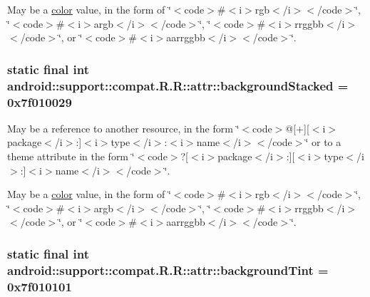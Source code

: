 May be a \hyperlink{classandroid_1_1support_1_1compat_1_1_r_1_1color}{color} value, in the form of \char`\"{}$<$code$>$\#$<$i$>$rgb$<$/i$>$$<$/code$>$\char`\"{}, \char`\"{}$<$code$>$\#$<$i$>$argb$<$/i$>$$<$/code$>$\char`\"{}, \char`\"{}$<$code$>$\#$<$i$>$rrggbb$<$/i$>$$<$/code$>$\char`\"{}, or \char`\"{}$<$code$>$\#$<$i$>$aarrggbb$<$/i$>$$<$/code$>$\char`\"{}. \hypertarget{classandroid_1_1support_1_1compat_1_1_r_1_1attr_b7229506c0bd5bcc93770d3d2d7aed3c}{
\subsubsection[{backgroundStacked}]{\setlength{\rightskip}{0pt plus 5cm}static final int android::support::compat.R.R::attr::backgroundStacked = 0x7f010029}}
\label{classandroid_1_1support_1_1compat_1_1_r_1_1attr_b7229506c0bd5bcc93770d3d2d7aed3c}


May be a reference to another resource, in the form \char`\"{}$<$code$>$@\mbox{[}+\mbox{]}\mbox{[}$<$i$>$package$<$/i$>$:\mbox{]}$<$i$>$type$<$/i$>$:$<$i$>$name$<$/i$>$$<$/code$>$\char`\"{} or to a theme attribute in the form \char`\"{}$<$code$>$?\mbox{[}$<$i$>$package$<$/i$>$:\mbox{]}\mbox{[}$<$i$>$type$<$/i$>$:\mbox{]}$<$i$>$name$<$/i$>$$<$/code$>$\char`\"{}. 

May be a \hyperlink{classandroid_1_1support_1_1compat_1_1_r_1_1color}{color} value, in the form of \char`\"{}$<$code$>$\#$<$i$>$rgb$<$/i$>$$<$/code$>$\char`\"{}, \char`\"{}$<$code$>$\#$<$i$>$argb$<$/i$>$$<$/code$>$\char`\"{}, \char`\"{}$<$code$>$\#$<$i$>$rrggbb$<$/i$>$$<$/code$>$\char`\"{}, or \char`\"{}$<$code$>$\#$<$i$>$aarrggbb$<$/i$>$$<$/code$>$\char`\"{}. \hypertarget{classandroid_1_1support_1_1compat_1_1_r_1_1attr_836f18675da2b4749f5d332fc49dee3a}{
\subsubsection[{backgroundTint}]{\setlength{\rightskip}{0pt plus 5cm}static final int android::support::compat.R.R::attr::backgroundTint = 0x7f010101}}
\label{classandroid_1_1support_1_1compat_1_1_r_1_1attr_836f18675da2b4749f5d332fc49dee3a}


